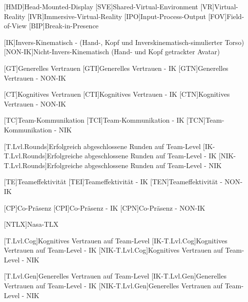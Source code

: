 \begin{acronym}
	[HMD]{Head-Mounted-Display}
	[SVE]{Shared-Virtual-Environment}
	[VR]{Virtual-Reality}
	[IVR]{Immersive-Virtual-Reality}
	[IPO]{Input-Process-Output}
	[FOV]{Field-of-View}
	[BIP]{Break-in-Presence}
	
	[IK]{Invers-Kinematisch - (Hand-, Kopf und Inverskinematisch-simulierter Torso)}
	[NON-IK]{Nicht-Invers-Kinematisch (Hand- und Kopf getrackter Avatar)}
	
	[GT]{Generelles Vertrauen}
	[GTI]{Generelles Vertrauen - IK}
	[GTN]{Generelles Vertrauen - NON-IK}
	
	[CT]{Kognitives Vertrauen}
	[CTI]{Kognitives Vertrauen - IK}
	[CTN]{Kognitives Vertrauen - NON-IK}
	
	[TC]{Team-Kommunikation}
	[TCI]{Team-Kommunikation - IK}
	[TCN]{Team-Kommunikation - NIK}
	
	[T.Lvl.Rounds]{Erfolgreich abgeschlossene Runden auf Team-Level}
	[IK-T.Lvl.Rounds]{Erfolgreiche abgeschlossene Runden auf Team-Level - IK}
	[NIK-T.Lvl.Rounds]{Erfolgreiche abgeschlossene Runden auf Team-Level - NIK}
	
	[TE]{Teameffektivität}
	[TEI]{Teameffektivität - IK}
	[TEN]{Teameffektivität - NON-IK}
	
	[CP]{Co-Präsenz}
	[CPI]{Co-Präsenz - IK}
	[CPN]{Co-Präsenz - NON-IK}
	
	[NTLX]{Nasa-TLX}
	
	[T.Lvl.Cog]{Kognitives Vertrauen auf Team-Level}
	[IK-T.Lvl.Cog]{Kognitives Vertrauen auf Team-Level - IK}
	[NIK-T.Lvl.Cog]{Kognitives Vertrauen auf Team-Level - NIK}
	
	[T.Lvl.Gen]{Generelles Vertrauen auf Team-Level}
	[IK-T.Lvl.Gen]{Generelles Vertrauen auf Team-Level - IK}
	[NIK-T.Lvl.Gen]{Generelles Vertrauen auf Team-Level - NIK}
	
\end{acronym}
